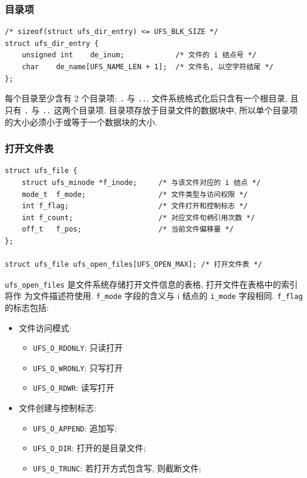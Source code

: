 \documentclass[nofonts, titlepage]{ctexart}
\begin{document}
\subsubsection{目录项}\label{ux76eeux5f55ux9879}

\begin{verbatim}
/* sizeof(struct ufs_dir_entry) <= UFS_BLK_SIZE */
struct ufs_dir_entry {
    unsigned int    de_inum;            /* 文件的 i 结点号 */
    char    de_name[UFS_NAME_LEN + 1];  /* 文件名, 以空字符结尾 */
};
\end{verbatim}

每个目录至少含有 2 个目录项: \texttt{.} 与 \texttt{..},
文件系统格式化后只含有一个根目录, 且只有 \texttt{.} 与 \texttt{..}
这两个目录项. 目录项存放于目录文件的数据块中,
所以单个目录项的大小必须小于或等于一个数据块的大小.

\subsubsection{打开文件表}\label{ux6253ux5f00ux6587ux4ef6ux8868}

\begin{verbatim}
struct ufs_file {
    struct ufs_minode *f_inode;     /* 与该文件对应的 i 结点 */
    mode_t  f_mode;                 /* 文件类型与访问权限 */
    int f_flag;                     /* 文件打开和控制标志 */
    int f_count;                    /* 对应文件句柄引用次数 */
    off_t   f_pos;                  /* 当前文件偏移量 */
};

struct ufs_file ufs_open_files[UFS_OPEN_MAX]; /* 打开文件表 */
\end{verbatim}

\texttt{ufs\_open\_files} 是文件系统存储打开文件信息的表格,
打开文件在表格中的索引将作 为文件描述符使用. \texttt{f\_mode}
字段的含义与 i 结点的 \texttt{i\_mode} 字段相同. \texttt{f\_flag}
的标志包括:
\begin{itemize}
    \item
        文件访问模式: 
        \begin{itemize}
            \item
                \texttt{UFS\_O\_RDONLY}: 只读打开
            \item
                \texttt{UFS\_O\_WRONLY}: 只写打开
            \item
                \texttt{UFS\_O\_RDWR}: 读写打开
        \end{itemize}
    \item
        文件创建与控制标志: 
        \begin{itemize}
            \item
                \texttt{UFS\_O\_APPEND}: 追加写; 
            \item
                \texttt{UFS\_O\_DIR}: 打开的是目录文件;
            \item
                \texttt{UFS\_O\_TRUNC}:
                若打开方式包含写, 则截断文件;
        \end{itemize}
\end{itemize}
\end{document}
